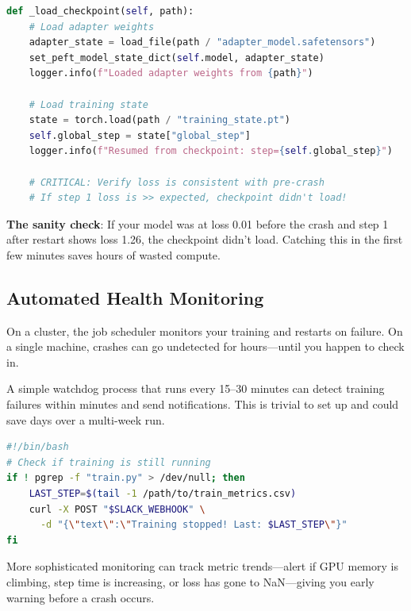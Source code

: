 \documentclass[11pt,a4paper]{article}
\begin{document}
\begin{lstlisting}[language=Python,caption=Checkpoint loading verification]
def _load_checkpoint(self, path):
    # Load adapter weights
    adapter_state = load_file(path / "adapter_model.safetensors")
    set_peft_model_state_dict(self.model, adapter_state)
    logger.info(f"Loaded adapter weights from {path}")
    
    # Load training state
    state = torch.load(path / "training_state.pt")
    self.global_step = state["global_step"]
    logger.info(f"Resumed from checkpoint: step={self.global_step}")
    
    # CRITICAL: Verify loss is consistent with pre-crash
    # If step 1 loss is >> expected, checkpoint didn't load!
\end{lstlisting}

\textbf{The sanity check}: If your model was at loss 0.01 before the crash and step 1 after restart shows loss 1.26, the checkpoint didn't load. Catching this in the first few minutes saves hours of wasted compute.

\subsection{Automated Health Monitoring}

On a cluster, the job scheduler monitors your training and restarts on failure. On a single machine, crashes can go undetected for hours---until you happen to check in.

\begin{keyinsight}
A simple watchdog process that runs every 15--30 minutes can detect training failures within minutes and send notifications. This is trivial to set up and could save days over a multi-week run.
\end{keyinsight}

\begin{lstlisting}[language=bash,caption=Simple training watchdog (run via cron)]
#!/bin/bash
# Check if training is still running
if ! pgrep -f "train.py" > /dev/null; then
    LAST_STEP=$(tail -1 /path/to/train_metrics.csv)
    curl -X POST "$SLACK_WEBHOOK" \
      -d "{\"text\":\"Training stopped! Last: $LAST_STEP\"}"
fi
\end{lstlisting}

More sophisticated monitoring can track metric trends---alert if GPU memory is climbing, step time is increasing, or loss has gone to NaN---giving you early warning before a crash occurs.
\end{document}
